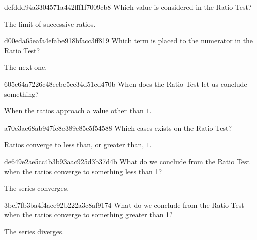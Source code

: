 \begin{note}{dcfddd94a3304571a442fff1f7009cb8}
    Which value is considered in the Ratio Test?

    \begin{cloze}{1}
        The limit of successive ratios.
    \end{cloze}
\end{note}

\begin{note}{d00eda65eafa4efabe918bfacc3ff819}
    Which term is placed to the numerator in the Ratio Test?

    \begin{cloze}{1}
        The next one.
    \end{cloze}
\end{note}

\begin{note}{605c64a7226c48eebe5ee34d51cd470b}
    When does the Ratio Test let us conclude something?

    \begin{cloze}{1}
        When the ratios approach a value other than \({ 1 }\).
    \end{cloze}
\end{note}

\begin{note}{a70e3ac68ab947fc8e389e85e5f54588}
    Which cases exists on the Ratio Test?

    \begin{cloze}{1}
        Ratios converge to less than, or greater than, \({ 1 }\).
    \end{cloze}
\end{note}

\begin{note}{de649e2ae5cc4b3b93aac925d3b37d4b}
    What do we conclude from the Ratio Test when the ratios converge to something less than 1?

    \begin{cloze}{1}
        The series converges.
    \end{cloze}
\end{note}

\begin{note}{3bcf7fb3ba4f4ace92b222a3c8af9174}
    What do we conclude from the Ratio Test when the ratios converge to something greater than 1?

    \begin{cloze}{1}
        The series diverges.
    \end{cloze}
\end{note}

